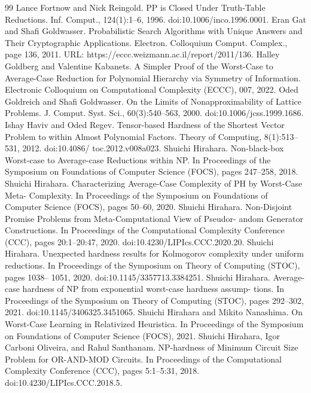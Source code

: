 \documentclass[10pt,a4paper]{article}
\begin{document}
\begin{thebibliography}{99}
 Lance Fortnow and Nick Reingold. PP is Closed Under Truth-Table Reductions. Inf. Comput., 124(1):1–6, 1996. doi:10.1006/inco.1996.0001.
 Eran Gat and Shafi Goldwasser. Probabilistic Search Algorithms with Unique Answers and Their Cryptographic Applications. Electron. Colloquium Comput. Complex., page 136, 2011. URL: https://eccc.weizmann.ac.il/report/2011/136.
 Halley Goldberg and Valentine Kabanets. A Simpler Proof of the Worst-Case to Average-Case Reduction for Polynomial Hierarchy via Symmetry of Information. Electronic Colloquium on Computational Complexity (ECCC), 007, 2022.
 Oded Goldreich and Shafi Goldwasser. On the Limits of Nonapproximability of Lattice Problems. J. Comput. Syst. Sci., 60(3):540–563, 2000. doi:10.1006/jcss.1999.1686.
 Ishay Haviv and Oded Regev. Tensor-based Hardness of the Shortest Vector Problem to within Almost Polynomial Factors. Theory of Computing, 8(1):513–531, 2012. doi:10.4086/ toc.2012.v008a023.
 Shuichi Hirahara. Non-black-box Worst-case to Average-case Reductions within NP. In Proceedings of the Symposium on Foundations of Computer Science (FOCS), pages 247–258, 2018.
 Shuichi Hirahara. Characterizing Average-Case Complexity of PH by Worst-Case Meta- Complexity. In Proceedings of the Symposium on Foundations of Computer Science (FOCS), pages 50–60, 2020.
 Shuichi Hirahara. Non-Disjoint Promise Problems from Meta-Computational View of Pseudor- andom Generator Constructions. In Proceedings of the Computational Complexity Conference (CCC), pages 20:1–20:47, 2020. doi:10.4230/LIPIcs.CCC.2020.20.
 Shuichi Hirahara. Unexpected hardness results for Kolmogorov complexity under uniform reductions. In Proceedings of the Symposium on Theory of Computing (STOC), pages 1038– 1051, 2020. doi:10.1145/3357713.3384251.
 Shuichi Hirahara. Average-case hardness of NP from exponential worst-case hardness assump- tions. In Proceedings of the Symposium on Theory of Computing (STOC), pages 292–302, 2021. doi:10.1145/3406325.3451065.
 Shuichi Hirahara and Mikito Nanashima. On Worst-Case Learning in Relativized Heuristica. In Proceedings of the Symposium on Foundations of Computer Science (FOCS), 2021.
 Shuichi Hirahara, Igor Carboni Oliveira, and Rahul Santhanam. NP-hardness of Minimum Circuit Size Problem for OR-AND-MOD Circuits. In Proceedings of the Computational Complexity Conference (CCC), pages 5:1–5:31, 2018. doi:10.4230/LIPIcs.CCC.2018.5.

\end{thebibliography}
\end{document}
